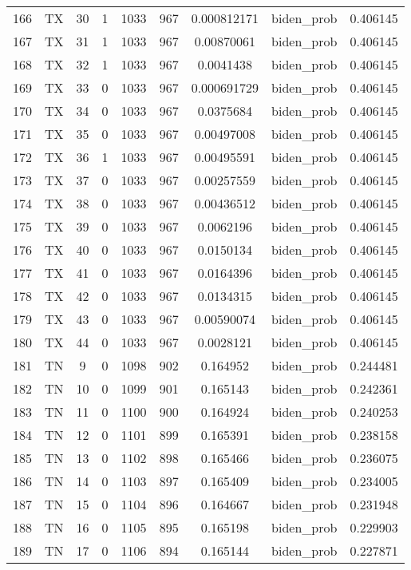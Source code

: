 \documentclass[12pt,a4paper]{article}
\begin{document}
\begin{tabular}{r|cccccccc}
	166 & TX & 30 & 1 & 1033 & 967 & 0.000812171 & biden\_prob & 0.406145 \\
	167 & TX & 31 & 1 & 1033 & 967 & 0.00870061 & biden\_prob & 0.406145 \\
	168 & TX & 32 & 1 & 1033 & 967 & 0.0041438 & biden\_prob & 0.406145 \\
	169 & TX & 33 & 0 & 1033 & 967 & 0.000691729 & biden\_prob & 0.406145 \\
	170 & TX & 34 & 0 & 1033 & 967 & 0.0375684 & biden\_prob & 0.406145 \\
	171 & TX & 35 & 0 & 1033 & 967 & 0.00497008 & biden\_prob & 0.406145 \\
	172 & TX & 36 & 1 & 1033 & 967 & 0.00495591 & biden\_prob & 0.406145 \\
	173 & TX & 37 & 0 & 1033 & 967 & 0.00257559 & biden\_prob & 0.406145 \\
	174 & TX & 38 & 0 & 1033 & 967 & 0.00436512 & biden\_prob & 0.406145 \\
	175 & TX & 39 & 0 & 1033 & 967 & 0.0062196 & biden\_prob & 0.406145 \\
	176 & TX & 40 & 0 & 1033 & 967 & 0.0150134 & biden\_prob & 0.406145 \\
	177 & TX & 41 & 0 & 1033 & 967 & 0.0164396 & biden\_prob & 0.406145 \\
	178 & TX & 42 & 0 & 1033 & 967 & 0.0134315 & biden\_prob & 0.406145 \\
	179 & TX & 43 & 0 & 1033 & 967 & 0.00590074 & biden\_prob & 0.406145 \\
	180 & TX & 44 & 0 & 1033 & 967 & 0.0028121 & biden\_prob & 0.406145 \\
	181 & TN & 9 & 0 & 1098 & 902 & 0.164952 & biden\_prob & 0.244481 \\
	182 & TN & 10 & 0 & 1099 & 901 & 0.165143 & biden\_prob & 0.242361 \\
	183 & TN & 11 & 0 & 1100 & 900 & 0.164924 & biden\_prob & 0.240253 \\
	184 & TN & 12 & 0 & 1101 & 899 & 0.165391 & biden\_prob & 0.238158 \\
	185 & TN & 13 & 0 & 1102 & 898 & 0.165466 & biden\_prob & 0.236075 \\
	186 & TN & 14 & 0 & 1103 & 897 & 0.165409 & biden\_prob & 0.234005 \\
	187 & TN & 15 & 0 & 1104 & 896 & 0.164667 & biden\_prob & 0.231948 \\
	188 & TN & 16 & 0 & 1105 & 895 & 0.165198 & biden\_prob & 0.229903 \\
	189 & TN & 17 & 0 & 1106 & 894 & 0.165144 & biden\_prob & 0.227871 \\

\end{tabular}
\end{document}
